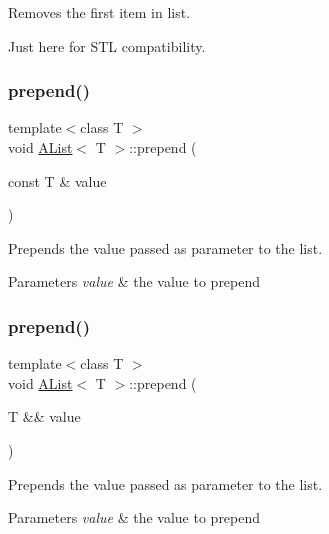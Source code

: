 Removes the first item in list. 

Just here for S\+TL compatibility. \mbox{\label{class_a_list_a35838eb653492086769df4c444e08281}} 
\subsubsection{\texorpdfstring{prepend()}{prepend()}\hspace{0.1cm}{\footnotesize\ttfamily [1/2]}}
{\footnotesize\ttfamily template$<$class T $>$ \\
void \mbox{\hyperlink{class_a_list}{A\+List}}$<$ T $>$\+::prepend (\begin{DoxyParamCaption}\item[{const T \&}]{value }\end{DoxyParamCaption})}



Prepends the value passed as parameter to the list. 


\begin{DoxyParams}{Parameters}
{\em value} & the value to prepend \\
\hline
\end{DoxyParams}
\mbox{\label{class_a_list_a6cae264346546d9e6cc68252a2e0b3d5}} 
\subsubsection{\texorpdfstring{prepend()}{prepend()}\hspace{0.1cm}{\footnotesize\ttfamily [2/2]}}
{\footnotesize\ttfamily template$<$class T $>$ \\
void \mbox{\hyperlink{class_a_list}{A\+List}}$<$ T $>$\+::prepend (\begin{DoxyParamCaption}\item[{T \&\&}]{value }\end{DoxyParamCaption})}



Prepends the value passed as parameter to the list. 


\begin{DoxyParams}{Parameters}
{\em value} & the value to prepend \\
\hline
\end{DoxyParams}
\mbox{\label{class_a_list_a32b8779cd05c79fe74f79c854b54a5f7}} 
